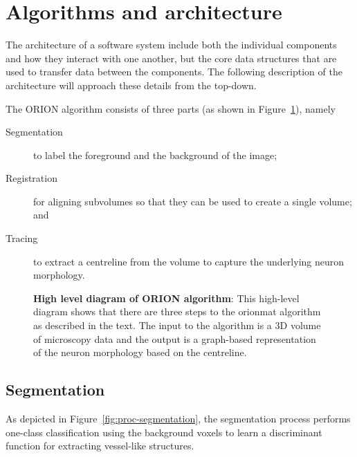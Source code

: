 \section{Algorithms and architecture}

The architecture of a software system include both the individual
components and how they interact with one another, but the core
data structures that are used to transfer data between the
components. The following description of the architecture will
approach these details from the top-down.

The ORION algorithm consists of three parts (as shown in
Figure~\ref{fig:high-level-arch}), namely
\begin{description}
	\item[Segmentation] to label the
		foreground and the background of the image;
	\item[Registration] for aligning subvolumes so
		that they can be used to create a single volume;
		and
	\item[Tracing] to extract a centreline from the volume to
		capture the underlying neuron morphology.
\end{description}

\begin{figure}
\centering
\resizebox{1.0\textwidth}{!}{}
\caption[High level diagram of ORION algorithm]{\textbf{High level
diagram of ORION algorithm}: This high-level diagram shows that
there are three steps to the \gls{orionmat} algorithm as described
in the text. The input to the algorithm is a 3D volume of
microscopy data and the output is a graph-based representation of
the neuron morphology based on the centreline.}\label{fig:high-level-arch}
\end{figure}

\subsection{Segmentation}

As depicted in Figure~\ref{fig:proc-segmentation}, the
segmentation process performs one-class classification using the
background voxels to learn a discriminant function for extracting
vessel-like structures.

